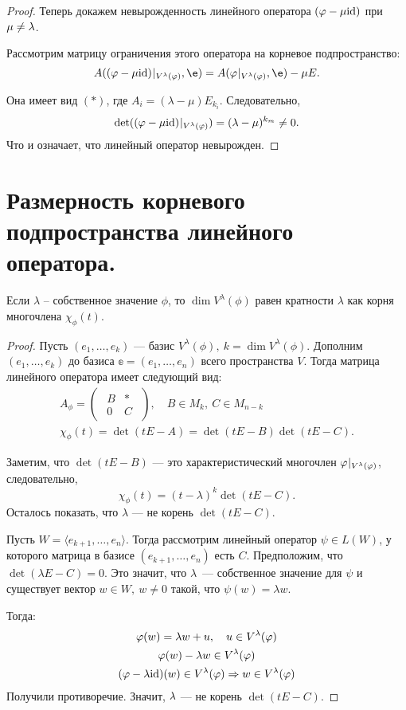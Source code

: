 \begin{proof}
	Теперь докажем невырожденность линейного оператора $(\varphi - \mu\mathrm{id})$ при $\mu \neq \lambda$.
	
	Рассмотрим матрицу ограничения этого оператора на корневое подпространство:
	$$
	A(\limref{(\phi - \mu \id)}{V^\l(\phi)}, \e) = A(\limref{\phi}{V^\l(\phi)}, \e) - \mu E.
	$$
	
	Она имеет вид $(*)$, где $A_i = (\lambda - \mu)E_{k_i}$. Следовательно,
	$$
	\det({(\varphi - \mu \mathrm{id})}\negmedspace\mid_{V^\lambda(\varphi)}) = (\lambda - \mu)^{k_m} \neq 0.
	$$
	Что и означает, что линейный оператор невырожден.
\end{proof}

\section{Размерность корневого подпространства линейного оператора.}

\begin{Suggestion}
	Если $\lambda$ -- собственное значение $\phi$, то $\dim{V^{\lambda}(\phi)}$ равен кратности 
	$\lambda$ как корня многочлена $\chi_\phi(t)$.
\end{Suggestion}

\begin{proof}
	Пусть $(e_1, \ldots, e_k)$ --- базис $V^{\lambda}(\phi),\ k = \dim{V^{\lambda}(\phi)}$. Дополним $(e_1, \ldots, e_k)$  до базиса $\mathbb{e} = (e_1, \ldots, e_n)$ всего пространства $V$. Тогда матрица линейного оператора имеет следующий вид:
	\begin{gather*}
	A_\phi = 
		\begin{pmatrix}
		\begin{array}{c|c}
		B & * \\ \hline
		0 & C
		\end{array}
		\end{pmatrix},\quad B \in M_k,\ C \in M_{n-k} \\
		\chi_\phi(t) = \det(tE - A) = \det(tE - B)\det(tE - C).
	\end{gather*}
	
	Заметим, что $\det(tE - B)$ --- это характеристический многочлен ${\varphi}\negmedspace\mid_{V^\lambda(\varphi)}$, следовательно, 
	$$
	\chi_\phi(t) = (t - \lambda)^k\det(tE - C).
	$$
	Осталось показать, что $\lambda$ --- не корень $\det(tE - C)$.
	
	Пусть $W = \langle e_{k+1}, \ldots, e_n \rangle$. Тогда рассмотрим линейный оператор $\psi \in L(W)$, у которого матрица в базисе $(e_{k+1}, \ldots, e_n)$ есть $C$. Предположим, что $\det(\lambda E - C) = 0.$ Это значит, что $\lambda$~--- собственное 	значение для $\psi$ и существует вектор $w \in W,\ w \neq 0$ такой, что $\psi(w) = \lambda w$.
	
	Тогда:
	\begin{gather*}
	\varphi(w) = \lambda w + u, \quad u \in V^\lambda(\varphi) \\
	\varphi(w) - \lambda w \in V^\lambda(\varphi) \\
	(\varphi - \lambda\mathrm{id})(w) \in V^\lambda(\varphi) \Rightarrow w \in V^\lambda(\varphi)
	\end{gather*}
	Получили противоречие. Значит, $\lambda$ --- не корень $\det(tE - C)$.
\end{proof}

